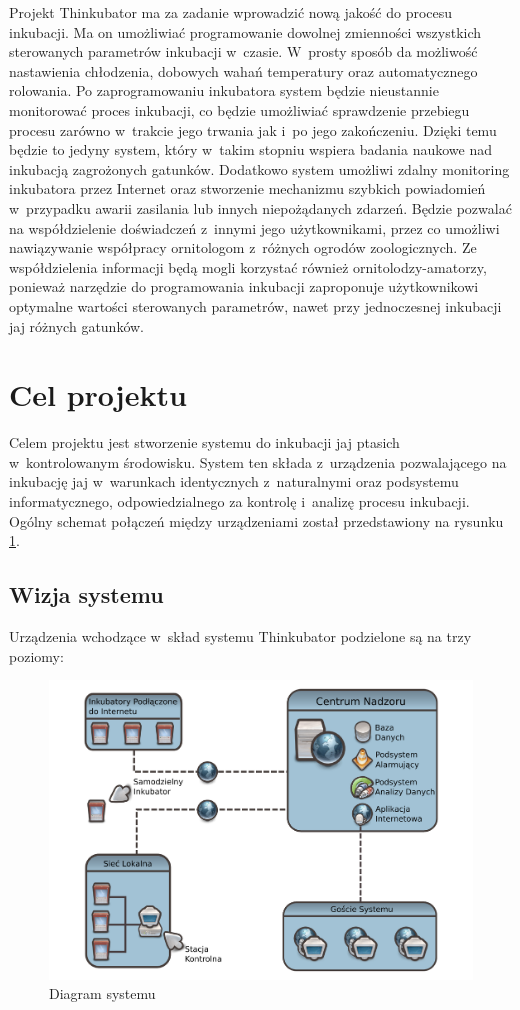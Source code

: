 Projekt Thinkubator ma za zadanie wprowadzić nową jakość do procesu inkubacji.
Ma on umożliwiać programowanie dowolnej zmienności wszystkich sterowanych
parametrów inkubacji w~czasie. W~prosty sposób da możliwość nastawienia chłodzenia,
dobowych wahań temperatury oraz automatycznego rolowania. Po zaprogramowaniu
inkubatora system będzie nieustannie monitorować proces inkubacji, co będzie umożliwiać
sprawdzenie przebiegu procesu zarówno w~trakcie jego trwania jak i~po jego
zakończeniu. Dzięki temu będzie to jedyny system, który w~takim stopniu wspiera
badania naukowe nad inkubacją zagrożonych gatunków. Dodatkowo system umożliwi
zdalny monitoring inkubatora przez Internet oraz stworzenie mechanizmu szybkich
powiadomień w~przypadku awarii zasilania lub innych niepożądanych zdarzeń.
Będzie pozwalać na współdzielenie doświadczeń z~innymi jego użytkownikami, przez co
umożliwi nawiązywanie współpracy ornitologom z~różnych ogrodów zoologicznych. Ze
współdzielenia informacji będą mogli korzystać również ornitolodzy-amatorzy,
ponieważ narzędzie do programowania inkubacji zaproponuje użytkownikowi
optymalne wartości sterowanych parametrów, nawet przy jednoczesnej inkubacji jaj
różnych gatunków.

\section{Cel projektu}
Celem projektu jest stworzenie systemu do inkubacji jaj ptasich w~kontrolowanym
środowisku. System ten składa z~urządzenia pozwalającego na inkubację jaj
w~warunkach identycznych z~naturalnymi oraz podsystemu informatycznego,
odpowiedzialnego za kontrolę i~analizę procesu inkubacji. Ogólny schemat
połączeń między urządzeniami został przedstawiony na rysunku
\ref{rys:SystemDiagram}.

\subsection{Wizja systemu}
Urządzenia wchodzące w~skład systemu Thinkubator podzielone są na trzy poziomy:

\begin{figure}[t] 
\centering\includegraphics[width=\textwidth]{figures/System_Diagram}
\caption{Diagram systemu}\label{rys:SystemDiagram}
\end{figure}

